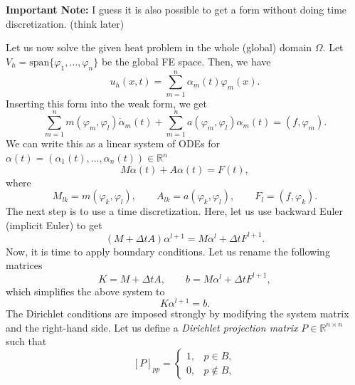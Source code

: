 \documentclass[a4paper, 11pt]{article}
\theoremstyle{plain}
\theoremstyle{definition}
\theoremstyle{remark}
\begin{document}
\noindent \textbf{Important Note:} I guess it is also possible to get a form without doing time discretization. (think later)

Let us now solve the given heat problem in the whole (global) domain $\Omega$. Let $V_{h} = \text{span}\{\varphi_{1}, \ldots, \varphi_{n}\}$ be the global FE space. Then, we have
\begin{equation*}
    u_{h}(x, t) = \sum_{m = 1}^{n}\alpha_{m}(t)\varphi_{m}(x).
\end{equation*}
Inserting this form into the weak form, we get
\begin{equation*}
    \sum_{m = 1}^{n}m(\varphi_{m}, \varphi_{l})\dot{\alpha}_{m}(t) + \sum_{m = 1}^{n}a(\varphi_{m}, \varphi_{l})\alpha_{m}(t) = (f, \varphi_{m}).
\end{equation*}
We can write this as a linear system of ODEs for $\alpha(t) = \left(\alpha_{1}(t), \ldots, \alpha_{n}(t)\right)\in \mathbb{R}^{n}$
\begin{equation*}
    M\dot{\alpha}(t) + A\alpha(t) = F(t),
\end{equation*}
where
\begin{equation*}
    M_{lk} = m(\varphi_{k}, \varphi_{l}), \qquad A_{lk} = a(\varphi_{k}, \varphi_{l}), \qquad F_{l} = (f, \varphi_{k}).
\end{equation*}
The next step is to use a time discretization. Here, let us use backward Euler (implicit Euler) to get
\begin{equation*}
    \left(M + \Delta t A\right)\alpha^{l+1} = M \alpha^{l} + \Delta tF^{l+1}.
\end{equation*}
Now, it is time to apply boundary conditions. Let us rename the following matrices
\begin{equation*}
    K = M + \Delta t A, \qquad b = M \alpha^{l} + \Delta tF^{l+1}, 
\end{equation*}
which simplifies the above system to
\begin{equation*}
    K\alpha^{l+1} = b.
\end{equation*}
The Dirichlet conditions are imposed strongly by modifying the system matrix and the right-hand side. Let us define a \textit{Dirichlet projection matrix} $P\in \mathbb{R}^{n\times n}$ such that
\begin{equation*}
    \left[P\right]_{pp} = 
    \begin{cases}
        1, & p\in B,\\
        0, & p\notin B,
    \end{cases}
\end{equation*}
\end{document}
